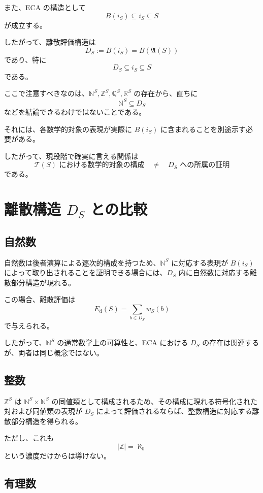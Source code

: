 \documentclass[a4paper,11pt]{article}
\newcommand{\N}{\mathbb{N}}
\newcommand{\Z}{\mathbb{Z}}
\newcommand{\Q}{\mathbb{Q}}
\newcommand{\R}{\mathbb{R}}
\begin{document}
また、ECA の構造として
\[
B(i_S)\subseteq i_S\subseteq S
\]
が成立する。

したがって、離散評価構造は
\[
\boxed{
D_S:=B(i_S)=B(\mathfrak{A}(S))
}
\]
であり、特に
\[
\boxed{
D_S\subseteq i_S\subseteq S
}
\]
である。

ここで注意すべきなのは、$\N^S,\Z^S,\Q^S,\R^S$ の存在から、直ちに
\[
\N^S\subseteq D_S
\]
などを結論できるわけではないことである。

それには、各数学的対象の表現が実際に $B(i_S)$ に含まれることを別途示す必要がある。

したがって、現段階で確実に言える関係は
\[
\boxed{
\mathcal{T}(S)\text{ における数学的対象の構成}
\quad\neq\quad
D_S\text{ への所属の証明}
}
\]
である。

\section{離散構造 $D_S$ との比較}

\subsection{自然数}

自然数は後者演算による逐次的構成を持つため、$\N^S$ に対応する表現が $B(i_S)$ によって取り出されることを証明できる場合には、$D_S$ 内に自然数に対応する離散部分構造が現れる。

この場合、離散評価は
\[
E_{\mathrm{d}}(S)
=
\sum_{b\in D_S}w_S(b)
\]
で与えられる。

したがって、$\N^S$ の通常数学上の可算性と、ECA における $D_S$ の存在は関連するが、両者は同じ概念ではない。

\subsection{整数}

$\Z^S$ は $\N^S\times\N^S$ の同値類として構成されるため、その構成に現れる符号化された対および同値類の表現が $D_S$ によって評価されるならば、整数構造に対応する離散部分構造を得られる。

ただし、これも
\[
|\Z|=\aleph_0
\]
という濃度だけからは導けない。

\subsection{有理数}
\end{document}
